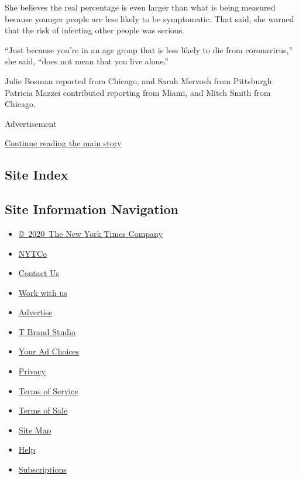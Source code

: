 She believes the real percentage is even larger than what is being
measured because younger people are less likely to be symptomatic. That
said, she warned that the risk of infecting other people was serious.

``Just because you're in an age group that is less likely to die from
coronavirus,'' she said, ``does not mean that you live alone.''

Julie Bosman reported from Chicago, and Sarah Mervosh from Pittsburgh.
Patricia Mazzei contributed reporting from Miami, and Mitch Smith from
Chicago.

Advertisement

\protect\hyperlink{after-bottom}{Continue reading the main story}

\hypertarget{site-index}{%
\subsection{Site Index}\label{site-index}}

\hypertarget{site-information-navigation}{%
\subsection{Site Information
Navigation}\label{site-information-navigation}}

\begin{itemize}
\tightlist
\item
  \href{https://help.nytimes3xbfgragh.onion/hc/en-us/articles/115014792127-Copyright-notice}{©~2020~The
  New York Times Company}
\end{itemize}

\begin{itemize}
\tightlist
\item
  \href{https://www.nytco.com/}{NYTCo}
\item
  \href{https://help.nytimes3xbfgragh.onion/hc/en-us/articles/115015385887-Contact-Us}{Contact
  Us}
\item
  \href{https://www.nytco.com/careers/}{Work with us}
\item
  \href{https://nytmediakit.com/}{Advertise}
\item
  \href{http://www.tbrandstudio.com/}{T Brand Studio}
\item
  \href{https://www.nytimes3xbfgragh.onion/privacy/cookie-policy\#how-do-i-manage-trackers}{Your
  Ad Choices}
\item
  \href{https://www.nytimes3xbfgragh.onion/privacy}{Privacy}
\item
  \href{https://help.nytimes3xbfgragh.onion/hc/en-us/articles/115014893428-Terms-of-service}{Terms
  of Service}
\item
  \href{https://help.nytimes3xbfgragh.onion/hc/en-us/articles/115014893968-Terms-of-sale}{Terms
  of Sale}
\item
  \href{https://spiderbites.nytimes3xbfgragh.onion}{Site Map}
\item
  \href{https://help.nytimes3xbfgragh.onion/hc/en-us}{Help}
\item
  \href{https://www.nytimes3xbfgragh.onion/subscription?campaignId=37WXW}{Subscriptions}
\end{itemize}
